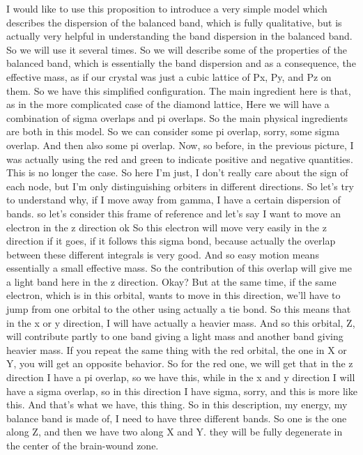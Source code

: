 I would like to use this proposition to introduce a very simple model which describes the dispersion of the balanced band, which is fully qualitative, but is actually very helpful in understanding the band dispersion in the balanced band. So we will use it several times. So we will describe some of the properties of the balanced band, which is essentially the band dispersion and as a consequence, the effective mass, as if our crystal was just a cubic lattice of Px, Py, and Pz on them. So we have this simplified configuration. The main ingredient here is that, as in the more complicated case of the diamond lattice, Here we will have a combination of sigma overlaps and pi overlaps. So the main physical ingredients are both in this model. So we can consider some pi overlap, sorry, some sigma overlap. And then also some pi overlap. Now, so before, in the previous picture, I was actually using the red and green to indicate positive and negative quantities. This is no longer the case. So here I'm just, I don't really care about the sign of each node, but I'm only distinguishing orbiters in different directions. So let's try to understand why, if I move away from gamma, I have a certain dispersion of bands. so let's consider this frame of reference and let's say I want to move an electron in the z direction ok So this electron will move very easily in the z direction if it goes, if it follows this sigma bond, because actually the overlap between these different integrals is very good. And so easy motion means essentially a small effective mass. So the contribution of this overlap will give me a light band here in the z direction. Okay? But at the same time, if the same electron, which is in this orbital, wants to move in this direction, we'll have to jump from one orbital to the other using actually a tie bond. So this means that in the x or y direction, I will have actually a heavier mass. And so this orbital, Z, will contribute partly to one band giving a light mass and another band giving heavier mass. If you repeat the same thing with the red orbital, the one in X or Y, you will get an opposite behavior. So for the red one, we will get that in the z direction I have a pi overlap, so we have this, while in the x and y direction I will have a sigma overlap, so in this direction I have sigma, sorry, and this is more like this. And that's what we have, this thing. So in this description, my energy, my balance band is made of, I need to have three different bands. So one is the one along Z, and then we have two along X and Y. they will be fully degenerate in the center of the brain-wound zone.
